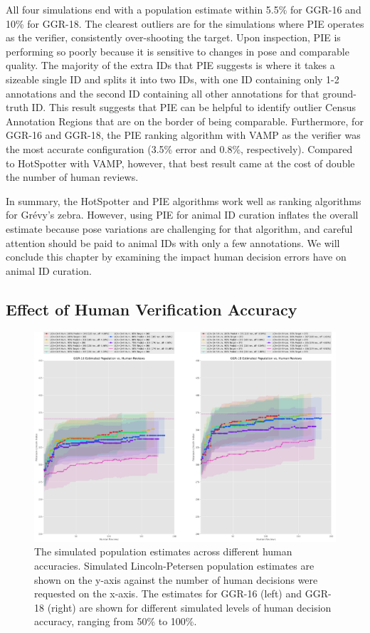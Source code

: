 All four simulations end with a population estimate within 5.5\% for GGR-16 and 10\% for GGR-18.  The clearest outliers are for the simulations where PIE operates as the verifier, consistently over-shooting the target.  Upon inspection, PIE is performing so poorly because it is sensitive to changes in pose and comparable quality.  The majority of the extra IDs that PIE suggests is where it takes a sizeable single ID and splits it into two IDs, with one ID containing only 1-2 annotations and the second ID containing all other annotations for that ground-truth ID.  This result suggests that PIE can be helpful to identify outlier Census Annotation Regions that are on the border of being comparable.  Furthermore, for GGR-16 and GGR-18, the PIE ranking algorithm with VAMP as the verifier was the most accurate configuration (3.5\% error and 0.8\%, respectively).  Compared to HotSpotter with VAMP, however, that best result came at the cost of double the number of human reviews.

In summary, the HotSpotter and PIE algorithms work well as ranking algorithms for Gr\'evy's zebra.  However, using PIE for animal ID curation inflates the overall estimate because pose variations are challenging for that algorithm, and careful attention should be paid to animal IDs with only a few annotations.  We will conclude this chapter by examining the impact human decision errors have on animal ID curation.

\subsection{Effect of Human Verification Accuracy}

\begin{figure}[!t]
    \begin{center}
        \includegraphics[width=0.9\linewidth]{resources/lca-decisions-humans-1.pdf}
    \end{center}
    \caption{The simulated population estimates across different human accuracies.  Simulated Lincoln-Petersen population estimates are shown on the y-axis against the number of human decisions were requested on the x-axis.  The estimates for GGR-16 (left) and GGR-18 (right) are shown for different simulated levels of human decision accuracy, ranging from 50\% to 100\%.}
    \label{fig:ca-sim-humans}
\end{figure}

